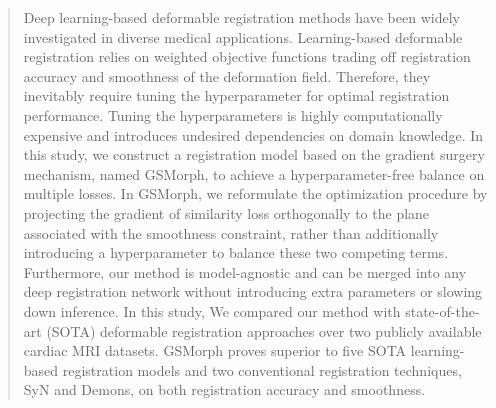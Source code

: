 \documentclass[runningheads]{llncs}
\begin{document}
%
\maketitle              %
%
\begin{abstract}
Deep learning-based deformable registration methods have been widely investigated in diverse medical applications.
Learning-based deformable registration relies on weighted objective functions trading off registration accuracy and smoothness of the deformation field. Therefore, they inevitably require tuning the hyperparameter for optimal registration performance. Tuning the hyperparameters is highly computationally expensive and introduces undesired dependencies on domain knowledge.
In this study, we construct a registration model based on the gradient surgery mechanism, named GSMorph, to achieve a hyperparameter-free balance on multiple losses.
In GSMorph, we reformulate the optimization procedure by projecting the gradient of similarity loss orthogonally to the plane associated with the smoothness constraint, rather than additionally introducing a hyperparameter to balance these two competing terms. 
Furthermore, our method is model-agnostic and can be merged into any deep registration network without introducing extra parameters or slowing down inference.
In this study, We compared our method with state-of-the-art (SOTA) deformable registration approaches over two publicly available cardiac MRI datasets. GSMorph proves superior to five SOTA learning-based registration models and two conventional registration techniques, SyN and Demons, on both registration accuracy and smoothness.
\end{abstract}
%
\end{document}
